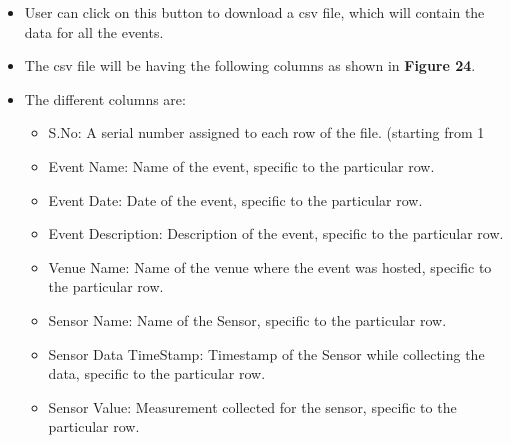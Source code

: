 \documentclass[12pt, letterpaper]{article}
\begin{document}
{{{{{{{{{\begin{itemize}
	\item User can click on this button to download a csv file, which will contain the data for all the events.
	\item The csv file will be having the following columns as shown in \textbf{Figure 24}.
	\item The different columns are:
	\begin{itemize}
		\item S.No: A serial number assigned to each row of the file. (starting from 1
		\item Event Name: Name of the event, specific to the particular row.
		\item Event Date: Date of the event, specific to the particular row.
		\item Event Description: Description of the event, specific to the particular row.
		\item Venue Name: Name of the venue where the event was hosted, specific to the particular row.
		\item Sensor Name: Name of the Sensor, specific to the particular row.
		\item Sensor Data TimeStamp: Timestamp of the Sensor while collecting the data, specific to the particular row.
		\item Sensor Value: Measurement collected for the sensor, specific to the particular row.
	\end{itemize}
\end{itemize}

}}}}}}}}}
\end{document}
